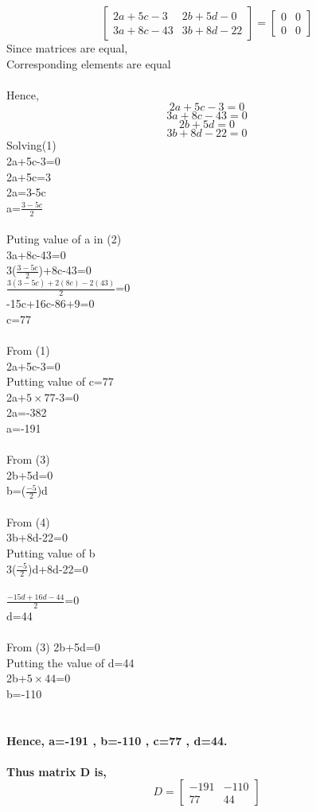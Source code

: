 \documentclass[a4paper,12pt]{article}
\begin{document}
\[\begin{bmatrix}
	2a+5c-3 & 2b+5d-0\\
	3a+8c-43 & 3b+8d-22
\end{bmatrix}=\begin{bmatrix}
	0 & 0\\
	0 & 0
\end{bmatrix}\]
Since matrices are equal,\\
Corresponding elements  are equal\\\\
Hence,\\
\begin{equation}
	2a+5c-3=0
\end{equation}
\begin{equation}
	3a+8c-43=0
\end{equation}
\begin{equation}
	2b+5d=0
\end{equation} 
\begin{equation}
	3b+8d-22=0
\end{equation}
Solving(1)\\
	2a+5c-3=0\\
	2a+5c=3\\
	2a=3-5c\\
	a=$\frac{3-5c}{2}$\\\\
Puting value of a in (2)\\
3a+8c-43=0\\
3($\frac{3-5c}{2}$)+8c-43=0\\
$\frac{3(3-5c)+2(8c)-2(43)}{2}$=0\\
-15c+16c-86+9=0\\
c=77\\\\
From (1)\\
2a+5c-3=0\\
Putting value of c=77\\
2a+$5\times77$-3=0\\
2a=-382\\
a=-191\\\\
From (3)\\
2b+5d=0\\
b=($\frac{-5}{2}$)d\\\\
From (4)\\
3b+8d-22=0\\Putting value of b \\
3($\frac{-5}{2}$)d+8d-22=0\\\\
$\frac{-15d+16d-44}{2}$=0\\
d=44\\\\
From (3)
2b+5d=0\\
Putting the value of d=44\\
2b+$5\times44$=0\\
b=-110\\\\
\paragraph{Hence, a=-191 , b=-110 , c=77 , d=44.}
\paragraph{Thus matrix D is,
\[D=\begin{bmatrix}
	-191 & -110\\
	77 & 44
\end{bmatrix}\]}
\end{document}
